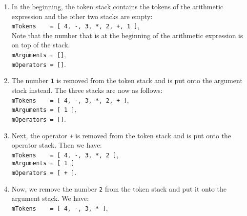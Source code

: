 \begin{enumerate}
\item In the beginning, the token stack contains the tokens of the arithmetic expression and the other two stacks
      are empty: \\[0.2cm]
      \hspace*{1.3cm} 
      \texttt{mTokens \ \ \ = [ 4, -, 3,
        *, 2, +, 1 ]}, 
      \\[0.2cm]
      Note that the number that is at the beginning of the arithmetic expression is on top of the
      stack.  \\[0.2cm]
      \hspace*{1.3cm} \texttt{mArguments = []}, \\[0.2cm]
      \hspace*{1.3cm} \texttt{mOperators = []}. 
\item The number \texttt{1} is removed from the token stack and is put onto the argument stack
      instead.  The three stacks are now as follows: \\[0.2cm]
      \hspace*{1.3cm} \texttt{mTokens \ \ \ = [ 4, -, 3, *, 2, + ]}, \\[0.2cm]
      \hspace*{1.3cm} \texttt{mArguments = [ 1 ]}, \\[0.2cm]
      \hspace*{1.3cm} \texttt{mOperators = []}. 
\item Next, the operator \texttt{+} is removed from the token stack and is put
      onto the operator stack.  Then we have: \\[0.2cm]
      \hspace*{1.3cm} \texttt{mTokens \ \ \ = [ 4, -, 3, *, 2 ]}, \\[0.2cm]
      \hspace*{1.3cm} \texttt{mArguments = [ 1 ]} \\[0.2cm]
      \hspace*{1.3cm} \texttt{mOperators = [ + ]}. 
\item Now, we remove the number \texttt{2} from the  token stack and put it onto the argument stack.
      We have: \\[0.2cm]
      \hspace*{1.3cm} \texttt{mTokens \ \ \ = [ 4, -, 3, * ]}, \\[0.2cm]

\end{enumerate}
